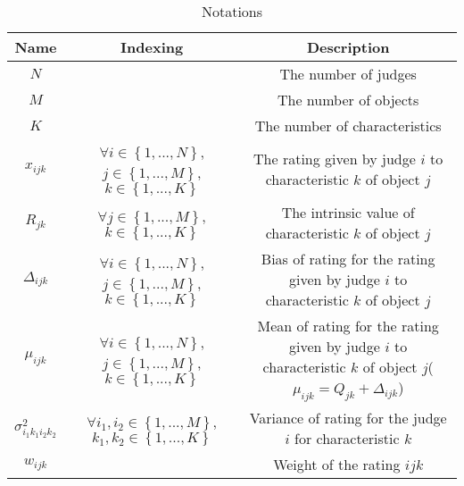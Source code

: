 \begin{table}[h]
\centering
\begin{tabular}{|c|c|c|}
\hline 
Name & Indexing  & Description \\ 
\hline
$N$ &  & The number of judges \\ 

$M$ &  & The number of objects \\ 
$K$ &  & The number of characteristics \\ 
$x_{ijk}$ & \parbox[t]{3cm}{$\forall i \in \left\lbrace 1,...,N\right\rbrace$,\newline
$j \in \left\lbrace 1,...,M\right\rbrace$,\newline
$k \in \left\lbrace 1,...,K\right\rbrace$ } &  \parbox[t]{5cm}{The rating given by judge $i$ to characteristic $k$ of object $j$} \\ 
$R_{jk}$ & 
\parbox[t]{3cm}{$\forall j \in \left\lbrace 1,...,M\right\rbrace$,\newline
$k \in \left\lbrace 1,...,K\right\rbrace$ } & \parbox[t]{5cm}{The intrinsic value of characteristic $k$ of object $j$}\\ 
$\Delta_{ijk}$ & 
\parbox[t]{3cm}{$\forall i \in \left\lbrace 1,...,N\right\rbrace$,\newline
$j \in \left\lbrace 1,...,M\right\rbrace$,\newline
$k \in \left\lbrace 1,...,K\right\rbrace$ }
& \parbox[t]{5cm}{Bias of rating for the rating given by judge $i$ to characteristic $k$ of object $j$} \\
$\mu_{ijk}$ & 
\parbox[t]{3cm}{$\forall i \in \left\lbrace 1,...,N\right\rbrace$,\newline
$j \in \left\lbrace 1,...,M\right\rbrace$,\newline
$k \in \left\lbrace 1,...,K\right\rbrace$ } 
& \parbox[t]{5cm}{Mean of rating for the rating given by judge $i$ to characteristic $k$ of object $j$($\mu_{ijk} = Q_{jk} + \Delta_{ijk}$)}\\
$\sigma_{i_1k_1i_2k_2}^2$ &
\parbox[t]{3cm}{$\forall i_1,i_2 \in \left\lbrace 1,...,M\right\rbrace$,\newline
$k_1,k_2 \in \left\lbrace 1,...,K\right\rbrace$ }
 & \parbox[t]{5cm}{Variance of rating for the judge $i$ for characteristic $k$}\\
$w_{ijk}$ & & \parbox[t]{5cm}{Weight of the rating $ijk$}\\
\hline 

\end{tabular} 
\caption{Notations}\label{table:notation}
\end{table}
